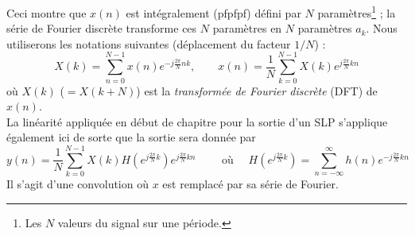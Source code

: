 	


\newpage
Ceci montre que $x(n)$ est intégralement (pfpfpf) défini par $N$ paramètres\footnote{
Les $N$ valeurs du signal sur une période.} ; la série de Fourier discrète transforme 
ces $N$ paramètres en $N$ paramètres $a_k$. Nous utiliserons les notations suivantes 
(déplacement du facteur $1/N$) :
\begin{equation}
X(k) = \sum_{n=0}^{N-1} x(n)e^{-j\frac{2\pi}{N}nk},\qquad x(n) =\frac{1}{N}\sum_{
k=0}^{N-1} X(k)e^{j\frac{2\pi}{N}kn}
\end{equation}
où $X(k)$ ($=X(k+N)$) est la \textit{transformée de Fourier discrète} (DFT) de $x(n)$.\\
La linéarité appliquée en début de chapitre pour la sortie d'un SLP s'applique également 
ici de sorte que la sortie sera donnée par
\begin{equation}
y(n) = \frac{1}{N}\sum_{k=0}^{N-1} X(k)H\left(e^{j\frac{2\pi}{N}k}\right)
e^{j\frac{2\pi}{N}kn}\qquad \text{ où }\quad H\left(e^{j\frac{2\pi}{N}k}\right) = 
\sum_{n=-\infty}^\infty h(n)e^{-j\frac{2\pi}{N}kn}
\end{equation}
Il s'agit d'une convolution où $x$ est remplacé par sa série de Fourier.
	
